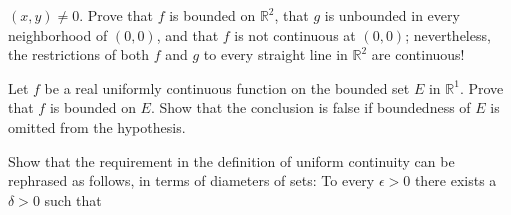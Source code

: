 \begin{exercise}
  \((x,y)\neq 0\).
  Prove that \(f\) is bounded on \(\mathbb{R}^2\), that \(g\) is unbounded in
  every neighborhood of \((0,0)\), and that \(f\) is not continuous at
  \((0,0)\); nevertheless, the restrictions of both \(f\) and \(g\) to every
  straight line in \(\mathbb{R}^2\) are continuous!
\item
  Let \(f\) be a real uniformly continuous function on the bounded set \(E\) in
  \(\mathbb{R}^1\).
  Prove that \(f\) is bounded on \(E\).
  Show that the conclusion is false if boundedness of \(E\) is omitted from the
  hypothesis.
\item
  Show that the requirement in the definition of uniform continuity can be
  rephrased as follows, in terms of diameters of sets: To every
  \(\epsilon > 0\) there exists a \(\delta > 0\) such that
  
\end{exercise}

